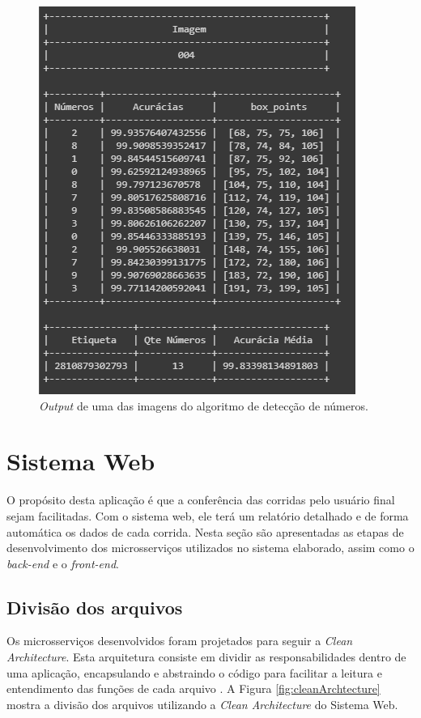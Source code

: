 \begin{figure}[H]
	\centering
	\includegraphics[width=0.53\linewidth]{figuras/MachineLearning/imageTag.png}
	\caption{\textit{Output} de uma das imagens do algoritmo de detecção de números.}
	\label{fig:imageTag}
\end{figure}

\section{Sistema Web}
O propósito desta aplicação é que a conferência das corridas pelo usuário final sejam facilitadas. Com o sistema web, ele terá um relatório detalhado e de forma automática os dados de cada corrida.
%
Nesta seção são apresentadas as etapas de desenvolvimento dos microsserviços utilizados no sistema elaborado, assim como o \textit{back-end} e o \textit{front-end}. 

\subsection*{Divisão dos arquivos}

Os microsserviços desenvolvidos foram projetados para seguir a \textit{Clean Architecture}. Esta arquitetura consiste em dividir as responsabilidades dentro de uma aplicação, encapsulando e abstraindo o código para facilitar a leitura e entendimento das funções de cada arquivo \cite{martin2000clean}. A Figura \ref{fig:cleanArchtecture} mostra a divisão dos arquivos utilizando a \textit{Clean Architecture} do Sistema Web.

